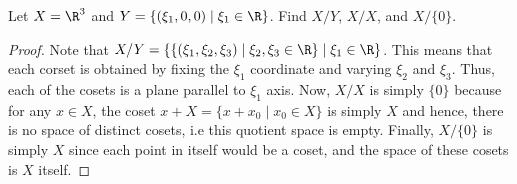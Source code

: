\begin{question}
    Let $X = \R^3$ and $Y = \{(\xi_1 , 0 , 0) \mid \xi_1 \in \R\}$. Find $X / Y$, $X / X$, and $X / \{0\}$.
    \label{section2.1-15}
\end{question}
\begin{proof}
    Note that $X/Y = \{\{(\xi_1 , \xi_2 , \xi_3) \mid \xi_2 , \xi_3 \in \R\} \mid  \xi_1 \in \R\}$. This means that each corset is obtained by fixing the $\xi_1$ coordinate and varying $\xi_2$ and $\xi_3$. Thus, each of the cosets is a plane parallel to $\xi_1$ axis. Now, $X / X$ is simply $\{0\}$ because for any $x \in X$, the coset $x + X  = \{x + x_0 \mid x_0 \in X\}$ is simply $X$ and hence, there is no space of distinct cosets, i.e this quotient space is empty. Finally, $X / \{0\}$ is simply $X$ since each point in itself would be a coset, and the space of these cosets is $X$ itself.
\end{proof}